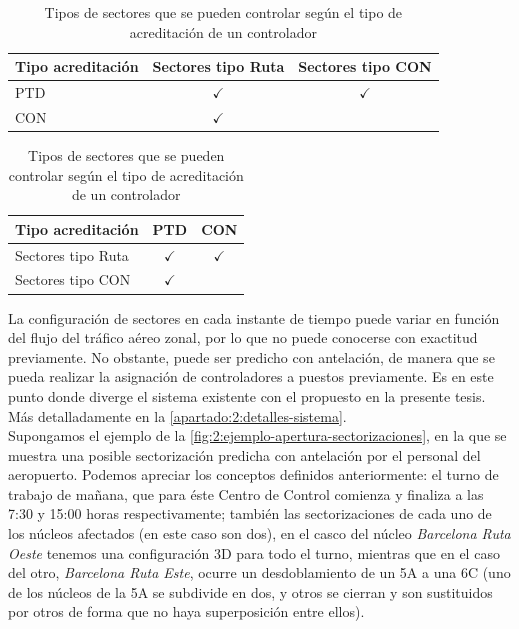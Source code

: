 \begin{table}[h]
	\centering
	\caption{Tipos de sectores que se pueden controlar según el tipo de acreditación de un controlador}
	\begin{tabular}{lcc}
		\hline
		\textbf{Tipo acreditación} & \textbf{Sectores tipo Ruta} & \textbf{Sectores tipo CON} \\ \hline
		PTD                        &        $\checkmark$         &        $\checkmark$        \\
		CON                        &        $\checkmark$         &                            \\ \hline
	\end{tabular}
	\label{table:2:acreditaciones}
\end{table}
\begin{table}[h]
	\centering
	\caption{Tipos de sectores que se pueden controlar según el tipo de acreditación de un controlador}
	\begin{tabular}{lcc}
		\hline
		\textbf{Tipo acreditación} & \textbf{PTD} & \textbf{CON} \\ \hline
		Sectores tipo Ruta         & $\checkmark$ & $\checkmark$ \\
		Sectores tipo CON          & $\checkmark$ &              \\ \hline
	\end{tabular}
	\label{table:2:acreditaciones2}
\end{table}


La configuración de sectores en cada instante de tiempo puede variar en función del flujo del tráfico aéreo zonal, por 
lo que no puede conocerse con exactitud previamente. No obstante, puede ser predicho con antelación, de manera que 
se pueda realizar la asignación de controladores a puestos previamente.
Es en este punto donde diverge el sistema existente con el propuesto en la presente tesis. Más detalladamente en la 
\autoref{apartado:2:detalles-sistema}.
\\

Supongamos el ejemplo de la \autoref{fig:2:ejemplo-apertura-sectorizaciones}, en la que se muestra una posible 
sectorización predicha 
con antelación por el personal del aeropuerto. Podemos apreciar los conceptos definidos anteriormente: el turno de 
trabajo de mañana, que para éste \gls{Centro de Control} comienza y finaliza a las 7:30 y 15:00 horas respectivamente; 
también las sectorizaciones de cada uno de los núcleos afectados (en este caso son dos), en el casco del núcleo 
\textit{Barcelona Ruta Oeste} tenemos una configuración 3D para todo el turno, mientras que en el caso del otro, 
\textit{Barcelona Ruta Este}, ocurre un desdoblamiento de un 5A a una 6C (uno de los núcleos de la 5A se subdivide en 
dos, y otros se cierran y son sustituidos por otros de forma que no haya superposición entre ellos).

